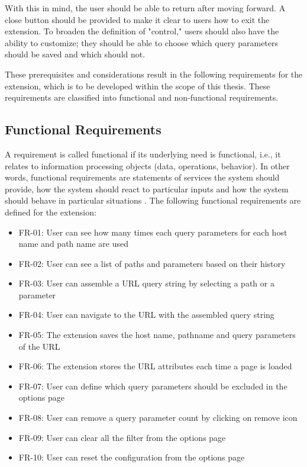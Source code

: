 \noindent With this in mind, the user should be able to return after moving forward. A close button should be provided to make it clear to users how to exit the extension. To broaden the definition of "control," users should also have the ability to customize; they should be able to choose which query parameters should be saved and which should not.

These prerequisites and considerations result in the following requirements for the extension, which is to be developed within the scope of this thesis. These requirements are classified into functional and non-functional requirements.

\subsection{Functional Requirements}
A requirement is called functional if its underlying need is functional, i.e., it relates to information processing objects (data, operations, behavior). In other words, functional requirements are statements of services the system should provide, how the system should react to particular inputs and how the system should behave in particular situations \autocite{sommerville2011software}. The following functional requirements are defined for the extension:

\begin{itemize}
  \item FR-01: User can see how many times each query parameters for each host name and path name are used
  \item FR-02: User can see a list of paths and parameters based on their history
  \item FR-03: User can assemble a URL query string by selecting a path or a parameter
  \item FR-04: User can navigate to the URL with the assembled query string
  \item FR-05: The extension saves the host name, pathname and query parameters of the URL
  \item FR-06: The extension stores the URL attributes each time a page is loaded
  \item FR-07: User can define which query parameters should be excluded in the options page
  \item FR-08: User can remove a query parameter count by clicking on remove icon
  \item FR-09: User can clear all the filter from the options page
  \item FR-10: User can reset the configuration from the options page
\end{itemize}

